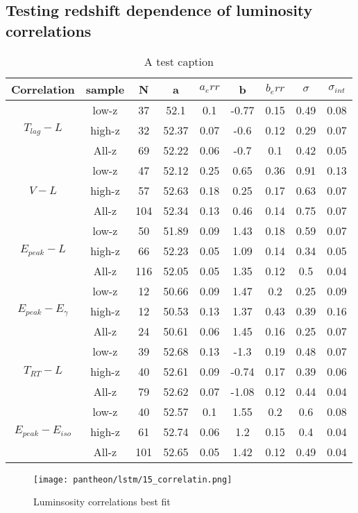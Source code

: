 \subsection{Testing redshift dependence of luminosity correlations}
\begin{table}[H]
\centering
\begin{tabular}{|c|c|c|c|c|c|c|c|c|}
\hline
Correlation & sample & N & a & $a_err$ & b & $b_err$ & $\sigma$ & $\sigma_{int}$\\
\hline
\multirow{3}{*}{$T_{lag}-L$} & low-z & 37 & 52.1 & 0.1 & -0.77 & 0.15 & 0.49 & 0.08\\
\cline{2-9}
 & high-z & 32 & 52.37 & 0.07 & -0.6 & 0.12 & 0.29 & 0.07\\
\cline{2-9}
 & All-z & 69 & 52.22 & 0.06 & -0.7 & 0.1 & 0.42 & 0.05\\
\hline
\multirow{3}{*}{$V-L$} & low-z & 47 & 52.12 & 0.25 & 0.65 & 0.36 & 0.91 & 0.13\\
\cline{2-9}
 & high-z & 57 & 52.63 & 0.18 & 0.25 & 0.17 & 0.63 & 0.07\\
\cline{2-9}
 & All-z & 104 & 52.34 & 0.13 & 0.46 & 0.14 & 0.75 & 0.07\\
\hline
\multirow{3}{*}{$E_{peak}-L$} & low-z & 50 & 51.89 & 0.09 & 1.43 & 0.18 & 0.59 & 0.07\\
\cline{2-9}
 & high-z & 66 & 52.23 & 0.05 & 1.09 & 0.14 & 0.34 & 0.05\\
\cline{2-9}
 & All-z & 116 & 52.05 & 0.05 & 1.35 & 0.12 & 0.5 & 0.04\\
\hline
\multirow{3}{*}{$E_{peak}-E_{\gamma}$} & low-z & 12 & 50.66 & 0.09 & 1.47 & 0.2 & 0.25 & 0.09\\
\cline{2-9}
 & high-z & 12 & 50.53 & 0.13 & 1.37 & 0.43 & 0.39 & 0.16\\
\cline{2-9}
 & All-z & 24 & 50.61 & 0.06 & 1.45 & 0.16 & 0.25 & 0.07\\
\hline
\multirow{3}{*}{$T_{RT}-L$} & low-z & 39 & 52.68 & 0.13 & -1.3 & 0.19 & 0.48 & 0.07\\
\cline{2-9}
 & high-z & 40 & 52.61 & 0.09 & -0.74 & 0.17 & 0.39 & 0.06\\
\cline{2-9}
 & All-z & 79 & 52.62 & 0.07 & -1.08 & 0.12 & 0.44 & 0.04\\
\hline
\multirow{3}{*}{$E_{peak}-E_{iso}$} & low-z & 40 & 52.57 & 0.1 & 1.55 & 0.2 & 0.6 & 0.08\\
\cline{2-9}
 & high-z & 61 & 52.74 & 0.06 & 1.2 & 0.15 & 0.4 & 0.04\\
\cline{2-9}
 & All-z & 101 & 52.65 & 0.05 & 1.42 & 0.12 & 0.49 & 0.04\\
\hline
\end{tabular}
\caption{A test caption}
\label{table_pantheon_lstm}
\end{table}


\begin{figure}[H]
	\centering
	\texttt{[image: pantheon/lstm/15\_correlatin.png]}
	\caption{Luminsosity correlations best fit}
	\label{fig:correlation_lstm}
\end{figure}
